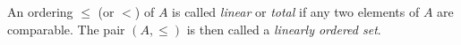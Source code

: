 \documentclass{article}
\begin{document}
An ordering $\le$ (or $<$) of $A$ is called \emph{linear} or \emph{total} if any two elements of $A$ are comparable.  The pair $(A,\le)$ is then called a \emph{linearly ordered set}.
\end{document}
